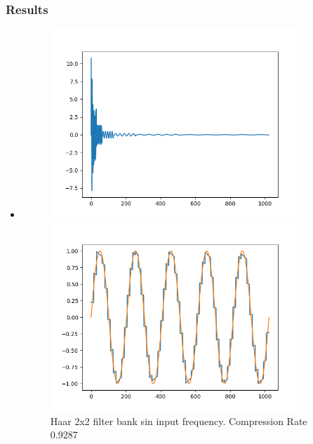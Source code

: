 \documentclass{beamer}
\begin{document}
\begin{frame}
    \frametitle{Results}
    \begin{itemize}
        \item
              \begin{figure}[ht!]
                  \centering
                  \begin{minipage}{0.45\textwidth}
                      \centering
                      \includegraphics[width=0.9\textwidth]{fig/HaarAugmented1D_sin_freq.png} %
                      \caption{Haar 2x2 filter bank sin input frequency. Compression Rate 0.9287}
                      \label{fig:Haar_sin}
                  \end{minipage}\hfill
                  \begin{minipage}{0.45\textwidth}
                      \centering
                      \includegraphics[width=0.9\textwidth]{fig/HaarAugmented1D_sin_rec.png} %

\end{minipage}
\end{figure}
\end{itemize}
\end{frame}
\end{document}
